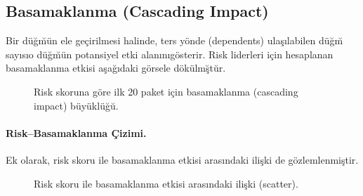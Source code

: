 \documentclass[11pt,a4paper]{article}
\begin{document}
\subsection{Basamaklanma (Cascading Impact)}
Bir d\"u\u{g}\u m\"un ele ge\c{c}irilmesi halinde, ters y\"onde (dependents) ula\c{s}\i labilen d\"u\u{g}\u m say\i s\i o d\"u\u{g}\u m\"un potansiyel etki alan\i n\i g\"osterir. Risk liderleri i\c{c}in hesaplanan basamaklanma etkisi a\c{s}a\u{g}\i daki g\"orsele d\"ok\"ulm\u\c{s}t\u{u}r.
\begin{figure}[h]
  \centering
  \caption{Risk skoruna g\"ore ilk 20 paket i\c{c}in basamaklanma (cascading impact) b\"uy\"ukl\"u\u{g}\u{u}.}
\end{figure}

\paragraph{Risk--Basamaklanma \c{C}izimi.} Ek olarak, risk skoru ile basamaklanma etkisi aras\i ndaki ili\c{s}ki de g\"ozlemlenmi\c{s}tir.
\begin{figure}[h]
  \centering
  \caption{Risk skoru ile basamaklanma etkisi aras\i ndaki ili\c{s}ki (scatter).}
\end{figure}
\end{document}
